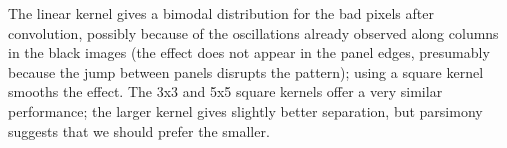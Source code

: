 \documentclass[10pt,fleqn]{article}
\begin{document}
The linear kernel gives a bimodal distribution for the bad pixels after convolution, possibly because of the oscillations already observed along columns in the  black images (the effect does not appear in the panel edges, presumably because the jump between panels disrupts the pattern); using a square kernel smooths the effect. The 3x3 and 5x5 square kernels offer a very similar performance; the larger kernel gives slightly better separation, but parsimony suggests that we should prefer the smaller.


\section*{ }
\end{document}
